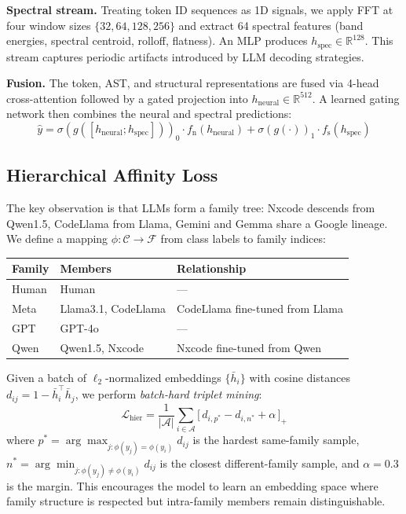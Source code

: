 \documentclass{article}
\begin{document}
\textbf{Spectral stream.} Treating token ID sequences as 1D signals, we apply FFT at four window sizes $\{32, 64, 128, 256\}$ and extract 64 spectral features (band energies, spectral centroid, rolloff, flatness). An MLP produces $h_{\text{spec}} \in \mathbb{R}^{128}$. This stream captures periodic artifacts introduced by LLM decoding strategies.

\textbf{Fusion.} The token, AST, and structural representations are fused via 4-head cross-attention followed by a gated projection into $h_{\text{neural}} \in \mathbb{R}^{512}$. A learned gating network then combines the neural and spectral predictions:
\begin{equation}
\hat{y} = \sigma(g([h_{\text{neural}}; h_{\text{spec}}]))_0 \cdot f_{\text{n}}(h_{\text{neural}}) + \sigma(g(\cdot))_1 \cdot f_{\text{s}}(h_{\text{spec}})
\end{equation}

\subsection{Hierarchical Affinity Loss}

The key observation is that LLMs form a family tree: Nxcode descends from Qwen1.5, CodeLlama from Llama, Gemini and Gemma share a Google lineage. We define a mapping $\phi: \mathcal{C} \to \mathcal{F}$ from class labels to family indices:
\begin{center}
\small
\begin{tabular}{lll}
\toprule
\textbf{Family} & \textbf{Members} & \textbf{Relationship} \\
\midrule
Human & Human & --- \\
Meta & Llama3.1, CodeLlama & CodeLlama fine-tuned from Llama \\
GPT & GPT-4o & --- \\
Qwen & Qwen1.5, Nxcode & Nxcode fine-tuned from Qwen \\
\bottomrule
\end{tabular}
\end{center}

Given a batch of $\ell_2$-normalized embeddings $\{\bar{h}_i\}$ with cosine distances $d_{ij} = 1 - \bar{h}_i^\top \bar{h}_j$, we perform \emph{batch-hard triplet mining}:
\begin{equation}
\mathcal{L}_{\text{hier}} = \frac{1}{|\mathcal{A}|} \sum_{i \in \mathcal{A}} \bigl[\, d_{i, p^*} - d_{i, n^*} + \alpha \,\bigr]_+
\end{equation}
where $p^* = \arg\max_{j: \phi(y_j) = \phi(y_i)} d_{ij}$ is the hardest same-family sample, $n^* = \arg\min_{j: \phi(y_j) \neq \phi(y_i)} d_{ij}$ is the closest different-family sample, and $\alpha=0.3$ is the margin. This encourages the model to learn an embedding space where family structure is respected but intra-family members remain distinguishable.
\end{document}
